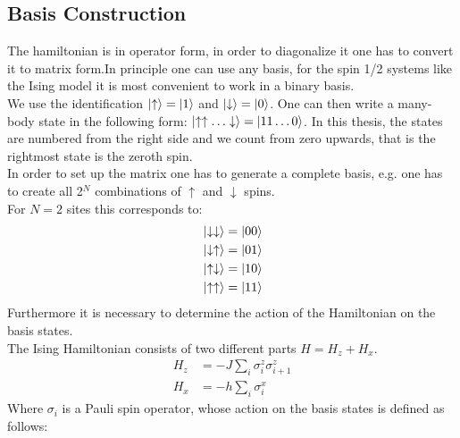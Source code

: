 \documentclass{article}
\begin{document}
\subsection{Basis Construction}
The hamiltonian is in operator form, in order to diagonalize it one has to convert it to matrix form.In principle one can use any basis, for the spin 1/2 systems like the Ising model it is most convenient to work in a binary basis.\\
We use the identification $\ket{\uparrow} = \ket{1}$ and $\ket{\downarrow} = \ket{0}$. One can then write a many-body state in the following form: $\ket{\uparrow \uparrow \dotso \downarrow} = \ket{11 \dotso 0}$. In this thesis, the states are numbered from the right side and we count from zero upwards, that is the rightmost state is the zeroth spin.\\
In order to set up the matrix one has to generate a complete basis, e.g. one has to create all 2$^{N}$ combinations of $\uparrow$ and $\downarrow$ spins.\\
For $N=2$ sites this corresponds to:
\begin{align*}
&\ket{\downarrow \downarrow} = \ket{00}\\
&\ket{\downarrow \uparrow} = \ket{01}\\
&\ket{\uparrow \downarrow} = \ket{10}\\
&\ket{\uparrow \uparrow} = \ket{11}\\
\end{align*}
Furthermore it is necessary to determine the action of the Hamiltonian on the basis states.\\
The Ising Hamiltonian consists of two different parts $H = H_z + H_x$.
\begin{align}
\label{eq:5}
H_z &= -J \sum\limits_{i}\sigma_i^z\sigma_{i+1}^z\\
H_x &= -h \sum\limits_i^{}\sigma_i^{x}
\end{align}
Where $\sigma_i$ is a Pauli spin operator, whose action on the basis states is defined as follows:
\end{document}

